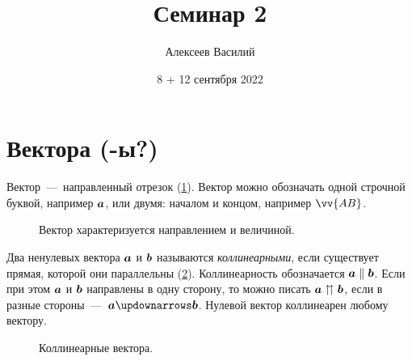 \documentclass[a4paper,12pt]{article}
\author{Алексеев Василий}
\title{Семинар 2}
\date{8 + 12 сентября 2022}
\begin{document}
  \maketitle
  
  \tableofcontents

  \thispagestyle{empty}
  
  \newpage
  


  \section{Вектора (-ы?)}
  
  Вектор~---~направленный отрезок (\ref{fig:vector}).
  Вектор можно обозначать одной строчной буквой, например $\boldsymbol a$, или двумя: началом и концом, например $\vv{AB}$.
  
  \begin{figure}[h]
    \centering
    
    
    \caption{Вектор характеризуется направлением и величиной.}
    \label{fig:vector}
  \end{figure}
  
  \begin{definition}[Коллинеарность]
    Два ненулевых вектора $\boldsymbol a$ и $\boldsymbol b$ называются \emph{коллинеарными}, если существует прямая, которой они параллельны (\ref{fig:collinearity}).
    Коллинеарность обозначается $\bds a \hm\parallel \bds b$.
    Если при этом $\boldsymbol a$ и $\boldsymbol b$ направлены в одну сторону, то можно писать $\bds a \hm\upuparrows \bds b$,
    если в разные стороны~---~$\bds a \hm\updownarrows \bds b$.
    Нулевой вектор коллинеарен любому вектору.
  \end{definition}
  
  \begin{figure}[h]
    \centering
    
    
    \caption{Коллинеарные вектора.}
    \label{fig:collinearity}
  \end{figure}
  
\end{document}
